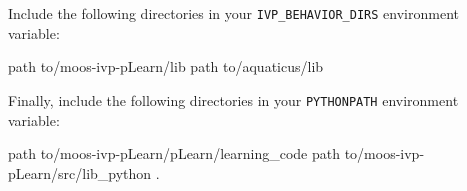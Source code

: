 \documentclass[onecolumn,letterpaper,11pt]{article}
\begin{document}
Include the following directories in your \texttt{IVP\_BEHAVIOR\_DIRS} environment variable: 

\vspace{0.15in}
\begin{fileverb}
{path to}/moos-ivp-pLearn/lib
{path to}/aquaticus/lib
\end{fileverb}
\vspace{0.15in}

Finally, include the following directories in your \texttt{PYTHONPATH} environment variable: 

\vspace{0.15in}
\begin{fileverb}
{path to}/moos-ivp-pLearn/pLearn/learning_code
{path to}/moos-ivp-pLearn/src/lib_python
.
\end{fileverb}
\vspace{0.15in}

\end{document}
